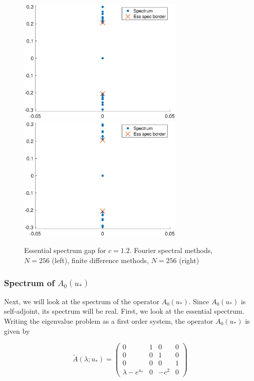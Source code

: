 \documentclass[12pt]{article}
\begin{document}
\begin{figure}[H]
\centering
\includegraphics[width=8cm]{essspecboundsF256.eps}
\includegraphics[width=8cm]{essspecboundsFD256.eps}
\caption{Essential spectrum gap for $c = 1.2$. Fourier spectral methods, $N = 256$ (left), finite difference methods, $N = 256$ (right)}
\end{figure}

\subsubsection{\texorpdfstring{Spectrum of $A_0(u_*)$}{}}

Next, we will look at the spectrum of the operator $A_0(u_*)$. Since $A_0(u_*)$ is self-adjoint, its spectrum will be real. First, we look at the essential spectrum. Writing the eigenvalue problem as a first order system, the operator $A_0(u_*)$ is given by

\begin{equation}\label{A0system}
\tilde{A}(\lambda; u_*) = \begin{pmatrix}
0 & 1 & 0 & 0 \\
0 & 0 & 1 & 0 \\
0 & 0 & 0 & 1 \\
\lambda - e^{u_*} & 0 & -c^2 & 0 
\end{pmatrix}
\end{equation}
\end{document}

